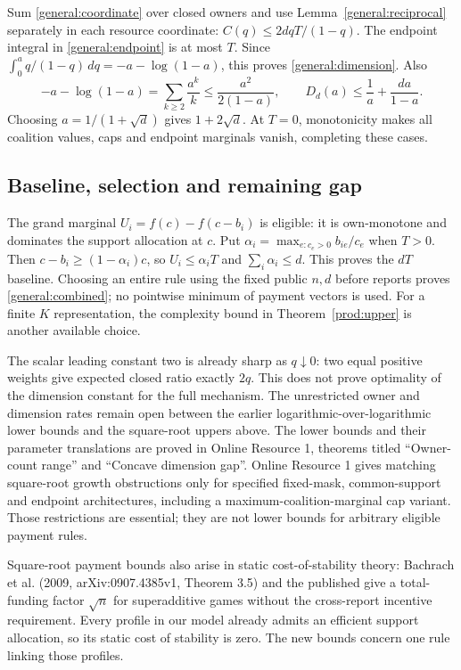 \documentclass[11pt]{article}
\theoremstyle{definition}\newtheorem{definition}[theorem]{Definition}
\theoremstyle{remark}\newtheorem{remark}[theorem]{Remark}
\begin{document}
Sum \eqref{general:coordinate} over closed owners and use
Lemma~\ref{general:reciprocal} separately in each resource coordinate:
$C(q)\le 2dqT/(1-q)$. The endpoint integral in
\eqref{general:endpoint} is at most $T$. Since
$\int_0^a q/(1-q)\,dq=-a-\log(1-a)$, this proves
\eqref{general:dimension}. Also
\[
 -a-\log(1-a)=\sum_{k\ge2}\frac{a^k}{k}
 \le\frac{a^2}{2(1-a)},\qquad
 D_d(a)\le\frac1a+\frac{da}{1-a}.
\]
Choosing $a=1/(1+\sqrt d)$ gives $1+2\sqrt d$.
At $T=0$, monotonicity makes all coalition values, caps and endpoint
marginals vanish, completing these cases.

\subsection{Baseline, selection and remaining gap}
The grand marginal $U_i=f(c)-f(c-b_i)$ is eligible: it is own-monotone and
dominates the support allocation at $c$. Put
$\alpha_i=\max_{e:c_e>0}b_{ie}/c_e$ when $T>0$.
Then $c-b_i\ge(1-\alpha_i)c$, so $U_i\le\alpha_iT$ and
$\sum_i\alpha_i\le d$. This proves the $dT$ baseline.
Choosing an entire rule using the fixed public $n,d$ before reports proves
\eqref{general:combined}; no pointwise minimum of payment vectors is used.
For a finite $K$ representation, the complexity bound in
Theorem~\ref{prod:upper} is another available choice.

The scalar leading constant two is already sharp as $q\downarrow0$:
two equal positive weights give expected closed ratio exactly $2q$.
This does not prove optimality of the dimension constant for the full mechanism.
The unrestricted owner and dimension rates remain open between the earlier
logarithmic-over-logarithmic lower bounds and the square-root uppers above.
The lower bounds and their parameter translations are proved in Online
Resource 1, theorems titled ``Owner-count range'' and ``Concave dimension gap''.
Online Resource 1 gives matching square-root growth obstructions only for
specified fixed-mask, common-support and endpoint architectures, including
a maximum-coalition-marginal cap variant. Those restrictions are essential;
they are not lower bounds for arbitrary eligible payment rules.

Square-root payment bounds also arise in static cost-of-stability theory:
Bachrach et al. (2009, arXiv:0907.4385v1, Theorem 3.5) and the published
\citet[Theorem 7]{Bachrach} give a total-funding factor $\sqrt n$ for
superadditive games without the cross-report incentive requirement. Every profile in our
model already admits an efficient support allocation, so its static cost of
stability is zero. The new bounds concern one rule linking those profiles.
\end{document}
